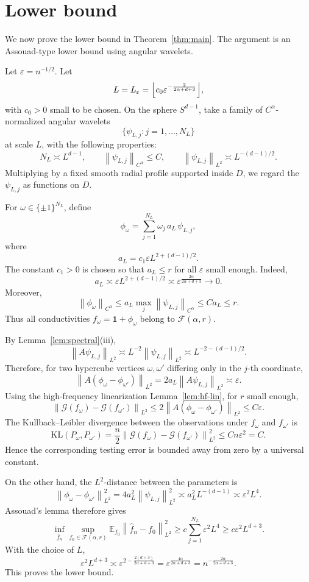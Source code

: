 \documentclass{article}
\theoremstyle{remark}
\newcommand{\E}{\mathbb E}
\newcommand{\cF}{\mathcal F}
\newcommand{\cG}{\mathcal G}
\newcommand{\norm}[1]{\left\|#1\right\|}
\newcommand{\one}{\mathbf 1}
\begin{document}
\section{Lower bound}

We now prove the lower bound in Theorem~\ref{thm:main}. The argument is an Assouad-type lower bound using angular wavelets.

Let \(\varepsilon=n^{-1/2}\). Let
\[
L=L_\varepsilon=\Bigl\lfloor c_0 \varepsilon^{-\frac{2}{2\alpha+d+3}}\Bigr\rfloor,
\]
with \(c_0>0\) small to be chosen. On the sphere \(S^{d-1}\), take a family of \(C^\alpha\)-normalized angular wavelets
\[
\{\psi_{L,j}:j=1,\dots,N_L\}
\]
at scale \(L\), with the following properties:
\[
N_L\asymp L^{d-1},\qquad
\norm{\psi_{L,j}}_{C^\alpha}\le C,\qquad
\norm{\psi_{L,j}}_{L^2}\asymp L^{-(d-1)/2}.
\]
Multiplying by a fixed smooth radial profile supported inside \(D\), we regard the \(\psi_{L,j}\) as functions on \(D\).

For \(\omega\in\{\pm1\}^{N_L}\), define
\[
\phi_\omega
=\sum_{j=1}^{N_L} \omega_j\, a_L\, \psi_{L,j},
\]
where
\[
a_L=c_1 \varepsilon L^{2+(d-1)/2}.
\]
The constant \(c_1>0\) is chosen so that \(a_L\le r\) for all \(\varepsilon\) small enough. Indeed,
\[
a_L
\asymp \varepsilon L^{2+(d-1)/2}
\asymp \varepsilon^{\frac{2\alpha}{2\alpha+d+3}}
\to 0.
\]
Moreover,
\[
\norm{\phi_\omega}_{C^\alpha}
\le a_L \max_j\norm{\psi_{L,j}}_{C^\alpha}
\le C a_L\le r.
\]
Thus all conductivities \(f_\omega=\one+\phi_\omega\) belong to \(\cF(\alpha,r)\).

By Lemma~\ref{lem:spectral}(iii),
\[
\norm{A\psi_{L,j}}_{L^2}
\asymp L^{-2}\norm{\psi_{L,j}}_{L^2}
\asymp L^{-2-(d-1)/2}.
\]
Therefore, for two hypercube vertices \(\omega,\omega'\) differing only in the \(j\)-th coordinate,
\[
\norm{A(\phi_\omega-\phi_{\omega'})}_{L^2}
=2a_L\norm{A\psi_{L,j}}_{L^2}
\asymp \varepsilon .
\]
Using the high-frequency linearization Lemma~\ref{lem:hf-lin}, for \(r\) small enough,
\[
\norm{\cG(f_\omega)-\cG(f_{\omega'})}_{L^2}
\le 2\norm{A(\phi_\omega-\phi_{\omega'})}_{L^2}
\le C\varepsilon .
\]
The Kullback--Leibler divergence between the observations under \(f_\omega\) and \(f_{\omega'}\) is
\[
\mathrm{KL}(P_\omega,P_{\omega'})
=\frac n2\norm{\cG(f_\omega)-\cG(f_{\omega'})}_{L^2}^2
\le C n\varepsilon^2=C.
\]
Hence the corresponding testing error is bounded away from zero by a universal constant.

On the other hand, the \(L^2\)-distance between the parameters is
\[
\norm{\phi_\omega-\phi_{\omega'}}_{L^2}^2
=4a_L^2\norm{\psi_{L,j}}_{L^2}^2
\asymp a_L^2 L^{-(d-1)}
\asymp \varepsilon^2 L^4.
\]
Assouad's lemma therefore gives
\[
\inf_{\hat f_n}\sup_{f_0\in \cF(\alpha,r)}
\E_{f_0}\norm{\hat f_n-f_0}_{L^2}^2
\ge c\sum_{j=1}^{N_L} \varepsilon^2 L^4
\ge c\varepsilon^2 L^{d+3}.
\]
With the choice of \(L\),
\[
\varepsilon^2 L^{d+3}
\asymp \varepsilon^{2-\frac{2(d+3)}{2\alpha+d+3}}
=\varepsilon^{\frac{4\alpha}{2\alpha+d+3}}
=n^{-\frac{2\alpha}{2\alpha+d+3}}.
\]
This proves the lower bound.
\end{document}
